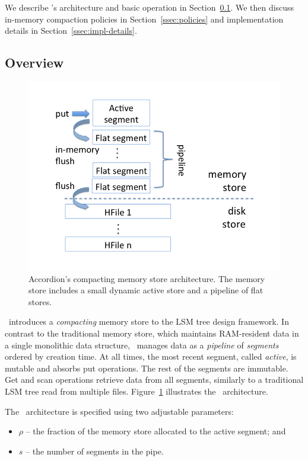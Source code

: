 
We describe  \sys's architecture and basic operation in Section~\ref{ssec:overview}.
We then discuss in-memory compaction policies  in  Section~\ref{ssec:policies}
and implementation details in Section~\ref{ssec:impl-details}. 

\subsection{Overview} \label{ssec:overview}

\begin{figure}[tbh]
\center
\includegraphics[width=\columnwidth, trim={0 1cm 0 1cm}, clip]{Accordion} 
\caption{Accordion's compacting memory store architecture. The memory store includes a small dynamic active store and a pipeline of flat stores. }
\label{fig:accordion}
\end{figure}

\sys\ introduces a \emph{compacting} memory store to the LSM tree design framework. In contrast to the traditional memory store, 
which maintains RAM-resident data in a single monolithic data structure, \sys\ manages data as a \emph{pipeline} of 
\emph{segments} ordered by creation time. At all times, the most recent segment, called \emph{active}, is mutable and absorbs 
 put operations. The rest of the segments are immutable. Get and scan operations retrieve data from all  segments, 
 similarly to a traditional LSM tree read from multiple files. Figure~\ref{fig:accordion} illustrates the \sys\ architecture. 

The \sys\ architecture is specified using two adjustable parameters:
\begin{itemize}
\item  $\rho$ -- the fraction of the memory store allocated to the active segment; and 
\item $s$ -- the number of segments in the pipe.
\end{itemize}

